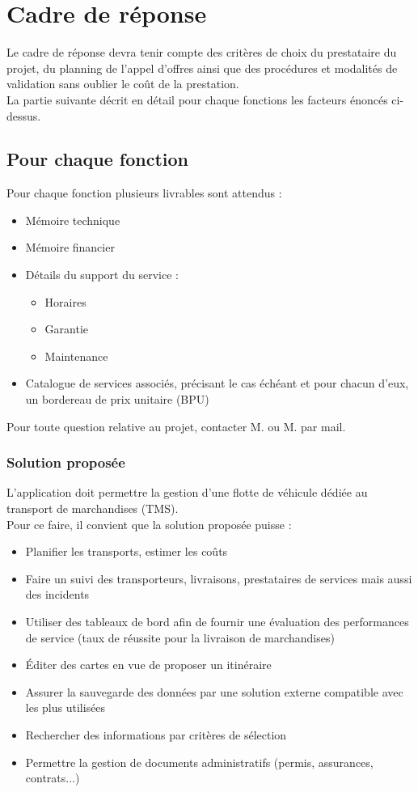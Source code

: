 \chapter{Cadre de réponse}
Le cadre de réponse devra tenir compte des critères de choix du prestataire du projet, du planning de l'appel d'offres ainsi que des procédures et modalités de validation sans oublier le coût de la prestation.
\\
La partie suivante décrit en détail pour chaque fonctions les facteurs énoncés ci-dessus.

\section{Pour chaque fonction}
Pour chaque fonction plusieurs livrables sont attendus :
\begin{itemize}[label=\textbullet]
 \item Mémoire technique
 \item Mémoire financier
 \item Détails du support du service :
 \begin{itemize}
  \item Horaires
  \item Garantie
 \item Maintenance
 \end{itemize}
 \item Catalogue de services associés, précisant le cas échéant et pour chacun d'eux, un bordereau de prix unitaire (BPU)
\end{itemize}
Pour toute question relative au projet, contacter M. \mj ou M. \roland par mail.

\subsection{Solution proposée}
L'application doit permettre la gestion d'une flotte de véhicule dédiée au transport de marchandises (TMS).
\\
Pour ce faire, il convient que la solution proposée puisse :
\begin{itemize}[label=\textbullet]
 \item Planifier les transports, estimer les coûts
 \item Faire un suivi des transporteurs, livraisons, prestataires de services mais aussi des incidents
 \item Utiliser des tableaux de bord afin de fournir une évaluation des performances de service (taux  de réussite pour la livraison de marchandises)
 \item Éditer des cartes en vue de proposer un itinéraire
 \item Assurer la sauvegarde des données par une solution externe compatible avec les plus utilisées
 \item Rechercher des informations par critères de sélection
 \item Permettre la gestion de documents administratifs (permis, assurances, contrats...)
\end{itemize}

